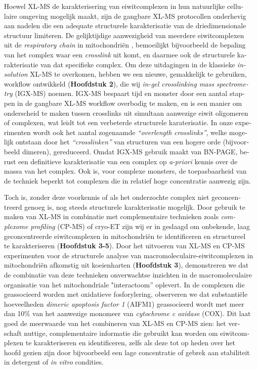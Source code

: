 \begin{otherlanguage}{dutch}
    Hoewel XL-MS de karakterisering van eiwitcomplexen in hun natuurlijke cellulaire omgeving mogelijk maakt, zijn de gangbare XL-MS protocollen onderhevig aan nadelen die een adequate structurele karakterisatie van de driedimensionale structuur limiteren. De gelijktijdige aanwezigheid van meerdere eiwitcomplexen uit de \emph{respiratory chain} in mitochondriën \cite{RN3}, bemoeilijkt bijvoorbeeld de bepaling van het complex waar een \emph{crosslink} uit komt, en daarmee ook de structurele karakterisatie van dat specifieke complex. Om deze uitdagingen in de klassieke \emph{in-solution} XL-MS te overkomen, hebben we een nieuwe, gemakkelijk te gebruiken, workflow ontwikkeld (\textbf{Hoofdstuk 2}), die wij \emph{in-gel crosslinking mass spectrometry} (IGX-MS) noemen. IGX-MS bespaart tijd en monster door een aantal stappen in de gangbare XL-MS workflow overbodig te maken, en is een manier om onderscheid te maken tussen crosslinks uit simultaan aanwezige eiwit oligomeren of complexen, wat leidt tot een verbeterde structurele karaterisatie. In onze experimenten wordt ook het aantal zogenaamde \emph{“overlength crosslinks”}, welke mogelijk ontstaan door het \emph{“crosslinken”} van structuren van een hogere orde (bijvoorbeeld dimeren), gereduceerd.
    Omdat IGX-MS gebruik maakt van BN-PAGE, berust een definitieve karakterisatie van een complex op \emph{a-priori} kennis over de massa van het complex. Ook is, voor complexe monsters, de toepasbaarheid van de techniek beperkt tot complexen die in relatief hoge concentratie aanwezig zijn.

    Toch is, zonder deze voorkennis of als het onderzochte complex niet geconcentreerd genoeg is, nog steeds structurele karakterisatie mogelijk. Door gebruik te maken van XL-MS in combinatie met complementaire technieken zoals \emph{complexome profiling} (CP-MS) of cryo-ET zijn wij er in geslaagd om onbekende, laag geconcentreerde eiwitcomplexen in mitochondriën te identificeren en structureel te karakteriseren (\textbf{Hoofdstuk 3-5}). Door het uitvoeren van XL-MS en CP-MS experimenten voor de structurele analyse van macromoleculaire-eiwitcomplexen in mitochondriën afkomstig uit koeienharten (\textbf{Hoofdstuk 3}), demonstreren we dat de combinatie van deze technieken onverwachtse inzichten in de macromoleculaire organisatie van het mitochondriale "interactoom” oplevert. In de complexen die geassocieerd worden met oxidatieve fosforylering, observeren we dat substantiële hoeveelheden \emph{dimeric apoptosis factor 1} (AIFM1) geassocieerd wordt met meer dan 10\% van het aanwezige monomeer van \emph{cytochrome c oxidase} (COX). Dit laat goed de meerwaarde van het combineren van XL-MS en CP-MS zien: het verschaft nuttige, complementaire informatie die gebruikt kan worden om eiwitcomplexen te karakteriseren en identificeren, zelfs als deze tot op heden over het hoofd gezien zijn door bijvoorbeeld een lage concentratie of gebrek aan stabiliteit in detergent of \emph{in vitro} condities.


\end{otherlanguage}

